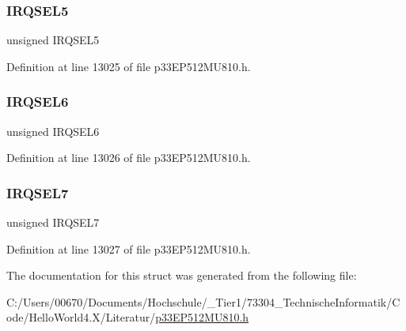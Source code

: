 \subsubsection{\texorpdfstring{I\+R\+Q\+S\+E\+L5}{IRQSEL5}}
{\footnotesize\ttfamily unsigned I\+R\+Q\+S\+E\+L5}



Definition at line 13025 of file p33\+E\+P512\+M\+U810.\+h.

\mbox{\label{structtag_d_m_a5_r_e_q_b_i_t_s_ace52408ef8c29561f3c56a3fbcbc8217}} 
\subsubsection{\texorpdfstring{I\+R\+Q\+S\+E\+L6}{IRQSEL6}}
{\footnotesize\ttfamily unsigned I\+R\+Q\+S\+E\+L6}



Definition at line 13026 of file p33\+E\+P512\+M\+U810.\+h.

\mbox{\label{structtag_d_m_a5_r_e_q_b_i_t_s_acce7dedecdf1f53cdbead3edf7c5d53a}} 
\subsubsection{\texorpdfstring{I\+R\+Q\+S\+E\+L7}{IRQSEL7}}
{\footnotesize\ttfamily unsigned I\+R\+Q\+S\+E\+L7}



Definition at line 13027 of file p33\+E\+P512\+M\+U810.\+h.



The documentation for this struct was generated from the following file\+:\begin{DoxyCompactItemize}
\item 
C\+:/\+Users/00670/\+Documents/\+Hochschule/\+\_\+\+Tier1/73304\+\_\+\+Technische\+Informatik/\+Code/\+Hello\+World4.\+X/\+Literatur/\hyperlink{p33_e_p512_m_u810_8h}{p33\+E\+P512\+M\+U810.\+h}\end{DoxyCompactItemize}
